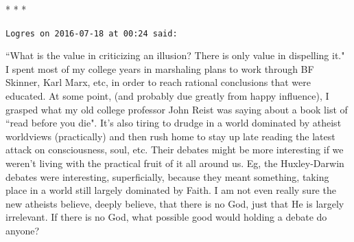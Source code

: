 
\begin{center}* * *\end{center}

\begin{footnotesize}\begin{sffamily}



\texttt{Logres on 2016-07-18 at 00:24 said: }

``What is the value in criticizing an illusion? There is only value in dispelling it." I spent most of my college years in marshaling plans to work through BF Skinner, Karl Marx, etc, in order to reach rational conclusions that were educated. At some point, (and probably due greatly from happy influence), I grasped what my old college professor John Reist was saying about a book list of ``read before you die". It's also tiring to drudge in a world dominated by atheist worldviews (practically) and then rush home to stay up late reading the latest attack on consciousness, soul, etc. Their debates might be more interesting if we weren't living with the practical fruit of it all around us. Eg, the Huxley-Darwin debates were interesting, superficially, because they meant something, taking place in a world still largely dominated by Faith. I am not even really sure the new atheists believe, deeply believe, that there is no God, just that He is largely irrelevant. If there is no God, what possible good would holding a debate do anyone?


\end{sffamily}\end{footnotesize}
